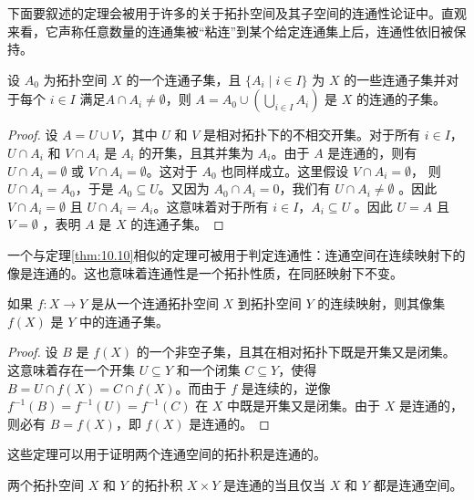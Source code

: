 	下面要叙述的定理会被用于许多的关于拓扑空间及其子空间的连通性论证中。直观来看，它声称任意数量的连通集被“粘连”到某个给定连通集上后，连通性依旧被保持。

\begin{theorem}\label{thm:10.16} 
	设 $A_{0}$ 为拓扑空间 $X$ 的一个连通子集，且 $\{A_{i} \mid i\in I\}$ 为 $X$ 的一些连通子集并对于每个 $i\in I$ 满足$A\cap A_{i} \neq \emptyset $，则 $A=A_{0} \cup \left(\bigcup _{i\in I} A_{i}\right)$ 是 $X$ 的连通的子集。
\end{theorem}

\begin{proof}
	设 $A=U\cup V$，其中 $U$ 和 $V$ 是相对拓扑下的不相交开集。对于所有 $i\in I$， $U\cap A_{i}$ 和 $V\cap A_{i}$ 是 $A_{i}$ 的开集，且其并集为 $A_{i}$。由于 $A$ 是连通的，则有 $U\cap A_{i} =\emptyset $ 或 $V\cap A_{i} =\emptyset $。这对于 $A_{0}$ 也同样成立。这里假设 $V\cap A_{i} =\emptyset $， 则$U\cap A_{i} =A_{0}$，于是 $A_{0} \subseteq U$。又因为 $A_{0} \cap A_{i} =0$，我们有 $U\cap A_{i} \neq \emptyset $ 。因此 $V\cap A_{i} =\emptyset $ 且  $U\cap A_{i} =A_{i}$。这意味着对于所有 $i\in I$，$A_{i} \subseteq U$ 。因此 $U=A$ 且 $V=\emptyset $ ，表明 $A$ 是 $X$ 的连通子集。
\end{proof}

	一个与定理\ref{thm:10.10}相似的定理可被用于判定连通性：连通空间在连续映射下的像是连通的。这也意味着连通性是一个拓扑性质，在同胚映射下不变。

\begin{theorem}\label{thm:10.17} 
如果 $f:X\rightarrow Y$ 是从一个连通拓扑空间 $X$ 到拓扑空间 $Y$ 的连续映射，则其像集 $f(X)$ 是 $Y$ 中的连通子集。
\end{theorem}

\begin{proof}
	设 $B$ 是 $f(X)$ 的一个非空子集，且其在相对拓扑下既是开集又是闭集。这意味着存在一个开集 $U\subseteq Y$ 和一个闭集 $C\subseteq Y$，使得 $B=U\cap f(X)=C\cap f(X)$。而由于 $f$ 是连续的，逆像 $f^{-1} (B)=f^{-1} (U)=f^{-1} (C)$ 在 $X$ 中既是开集又是闭集。由于 $X$ 是连通的，则必有 $B=f(X)$，即 $f(X)$ 是连通的。
\end{proof}

这些定理可以用于证明两个连通空间的拓扑积是连通的。

\begin{theorem}\label{thm:10.18} 
	两个拓扑空间 $X$ 和 $Y$ 的拓扑积 $X\times Y$ 是连通的当且仅当 $X$ 和 $Y$ 都是连通空间。
\end{theorem}

